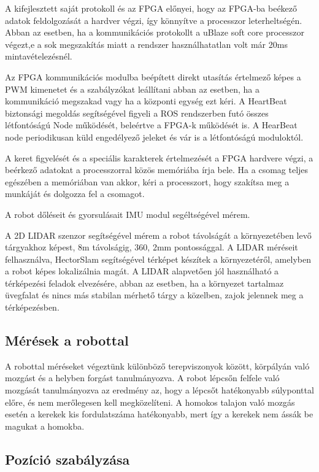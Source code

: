 \begin{titlepage}
A kifejlesztett saját protokoll és az FPGA előnyei, hogy az FPGA-ba beékező adatok feldolgozását a hardver végzi, így könnyítve a processzor leterheltségén. Abban az esetben, ha a kommunikációs protokollt a uBlaze soft core processzor végezt,e a sok megszakítás miatt a rendszer használhatatlan volt már 20ms mintavételezésnél.

Az FPGA kommunikációs modulba beépített direkt utasítás értelmező képes a PWM kimenetet és a szabályzókat leállítani abban az esetben, ha a kommunikáció megszakad vagy ha a központi egység ezt kéri.
A HeartBeat biztonsági megoldás segítségével figyeli a ROS rendszerben futó összes létfontóságú Node működését, beleértve a FPGA-k működését is. A HearBeat node periodikusan küld engedélyező jeleket és vár is a létfontóságú moduloktól.

A keret figyelését és a speciális karakterek értelmezését a FPGA  hardvere végzi, a beérkező adatokat a processzorral közös memóriába írja bele. Ha a csomag teljes egészében a memóriában van akkor, kéri a processzort, hogy szakítsa meg a munkáját és dolgozza fel a csomagot.






 A robot dőléseit és gyorsulásait IMU modul segéltségével mérem.

A 2D LIDAR szenzor segítségével mérem a robot távolságát a környezetében levő tárgyakhoz képest, 8m távolságig, 360\degree, 2mm pontossággal. A LIDAR méréseit felhasználva, HectorSlam segítségével térképet készítek a környezetéről, amelyben a robot képes lokalizálnia magát.
A LIDAR alapvetően jól használható a térképezési feladok elvezésére, abban az esetben, ha a környezet tartalmaz üvegfalat és nincs más stabilan mérhető tárgy a közelben, zajok jelennek meg a térképezésben. 

\subsection{Mérések a robottal}

A robottal méréseket végeztünk különböző terepviszonyok között, körpályán való mozgást és a helyben forgást tanulmányozva. A robot lépcsőn felfele való mozgását tanulmányozva az eredmény az, hogy a lépcsőt hatékonyabb súlyponttal előre, és nem merőlegesen kell megközelíteni. A homokos talajon való mozgás esetén a kerekek kis fordulatszáma hatékonyabb, mert így a kerekek nem ássák be magukat a homokba. 



\subsection{Pozíció szabályzása}


\end{titlepage}
